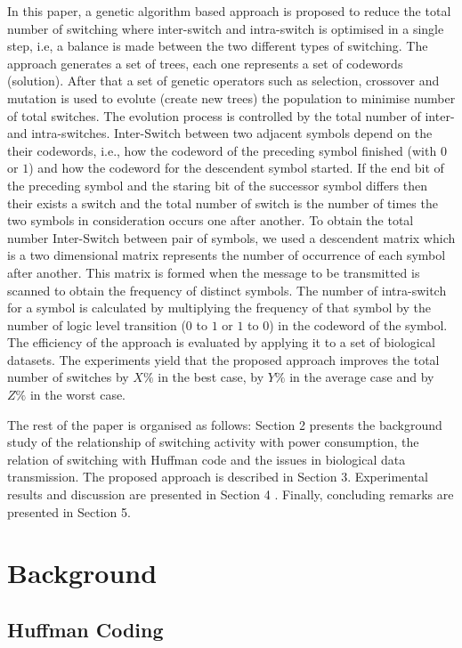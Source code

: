 \documentclass[preprint,12pt]{elsarticle}
\begin{document}
In this paper, a genetic algorithm based approach is proposed to reduce the total number of switching where inter-switch and intra-switch is optimised in a single step, i.e, a balance is made between the two different types of switching. The approach generates a set of trees, each one represents a set of codewords (solution). After that a set of genetic operators such as selection, crossover and mutation is used to evolute (create new trees) the population to minimise number of total switches. The evolution process is controlled by the total number of inter- and intra-switches.  Inter-Switch between two adjacent symbols depend on the their codewords, i.e., how the codeword of the preceding symbol finished (with $0$ or $1$) and how the codeword for the descendent symbol started. If the end bit of the preceding symbol and the staring bit of the successor symbol differs then their exists a switch and the total number of switch is the number of times the two symbols in consideration occurs one after another. To obtain the total number Inter-Switch between pair of symbols, we used a descendent matrix which is a two dimensional matrix represents the number of occurrence of each symbol after another. This matrix is formed when the message to be transmitted is scanned to obtain the frequency of distinct symbols. The number of intra-switch for a symbol is calculated by multiplying the frequency of that symbol by the number of logic level transition ($0$ to $1$ or $1$ to $0$) in the codeword of the symbol. The efficiency of the approach is evaluated by applying it to a set of biological datasets. The experiments yield that the proposed approach improves the total number of switches by $X\%$ in the best case, by $Y\%$ in the average case and by $Z\%$
in the worst case.

The rest of the paper is organised as follows:
Section 2 presents the background study of the
relationship of switching activity with power consumption, the relation of switching with Huffman code and the issues in biological data transmission. The proposed approach is described in Section 3. Experimental results and
discussion are presented in Section 4 . Finally,
concluding remarks are presented in Section 5. 
\section{Background}
\subsection{Huffman Coding}
\end{document}
